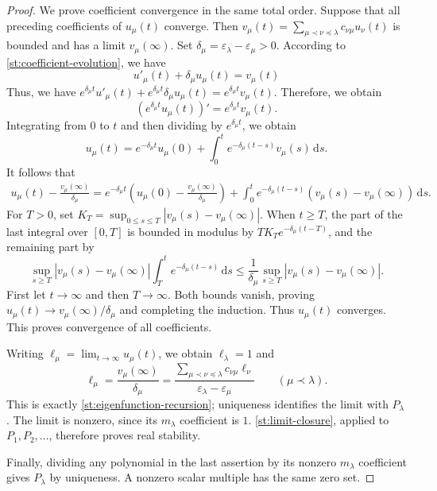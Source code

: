 \documentclass[reqno, 12pt]{article}
\numberwithin{equation}{section}
\theoremstyle{definition}
\begin{document}
\begin{proof}
We prove coefficient convergence in the same total order.  Suppose that all preceding coefficients of $u_{\mu}(t)$ converge.  Then
$v_\mu(t)=\sum_{\mu\prec\nu\preceq\lambda}c_{\nu\mu}u_\nu(t)$
is bounded and has a limit $v_\mu(\infty)$.
Set $\delta_\mu=\varepsilon_\lambda-\varepsilon_\mu>0$.
According to \eqref{st:coefficient-evolution}, we have
$$u'_\mu(t) + \delta_\mu u_\mu(t) = v_\mu(t)$$
Thus, we have $e^{\delta_\mu t} u'_\mu(t) + e^{\delta_\mu t}\delta_\mu u_\mu(t) =e^{\delta_\mu t} v_\mu(t)$.
Therefore, we obtain
$$(e^{\delta_\mu t} u_\mu(t))'=e^{\delta_\mu t} v_\mu(t).$$
Integrating from $0$ to $t$ and then dividing by $e^{\delta_\mu t}$, we obtain 
\begin{equation}\label{st:variation-of-constants}
u_\mu(t)=e^{-\delta_\mu t}u_\mu(0)
 +\int_0^t e^{-\delta_\mu(t-s)}v_\mu(s)\,\mathrm ds.
\end{equation}
It follows that
\begin{align*}
u_\mu(t)-\frac{v_\mu(\infty)}{\delta_\mu}=e^{-\delta_\mu t}\left(u_\mu(0)-\frac{v_\mu(\infty)}{\delta_\mu}\right)+\int_0^t e^{-\delta_\mu(t-s)}(v_\mu(s)-v_\mu(\infty))\,\mathrm ds.
\end{align*}
For $T>0$, set
$K_T=\sup_{0\leq s\leq T}|v_\mu(s)-v_\mu(\infty)|$.
When $t\geq T$, the part of the last integral over $[0,T]$ is
bounded in modulus by $TK_Te^{-\delta_\mu(t-T)}$, and the
remaining part by
\[
\sup_{s\geq T}|v_\mu(s)-v_\mu(\infty)|
 \int_T^t e^{-\delta_\mu(t-s)}\,\mathrm ds
\leq\frac1{\delta_\mu}
 \sup_{s\geq T}|v_\mu(s)-v_\mu(\infty)|.
\]
First let $t\to\infty$ and then $T\to\infty$.
Both bounds vanish, proving
$u_\mu(t)\to v_\mu(\infty)/\delta_\mu$ and completing the induction.
Thus $u_\mu(t)$ converges. This proves convergence of all coefficients.

Writing $\ell_\mu=\lim_{t\to\infty}u_\mu(t)$, we obtain
$\ell_\lambda=1$ and
\begin{equation}\label{st:limit-recursion}
\ell_\mu
=\frac{v_\mu(\infty)}{\delta_\mu}
=\frac{\displaystyle\sum_{\mu\prec\nu\preceq\lambda}
                 c_{\nu\mu}\ell_\nu}
       {\varepsilon_\lambda-\varepsilon_\mu}
\qquad(\mu\prec\lambda).
\end{equation}
This is exactly \eqref{st:eigenfunction-recursion}; uniqueness
identifies the limit with $P_\lambda$.  The limit is nonzero,
since its $m_\lambda$ coefficient is $1$. \cref{st:limit-closure}, applied to $P_1,P_2,\ldots$,
therefore proves real stability.

Finally, dividing any polynomial in the last assertion by its
nonzero $m_\lambda$ coefficient gives $P_\lambda$ by uniqueness.
A nonzero scalar multiple has the same zero set.
\end{proof}
\end{document}
